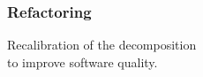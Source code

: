 \begin{frame}

\frametitle{Refactoring}

\begin{center}

Recalibration of the decomposition \\ to improve software quality.

\end{center}

\end{frame}
